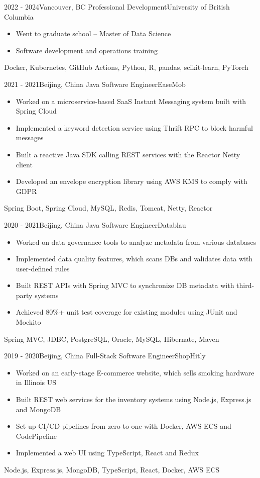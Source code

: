 \begin{experiences}

\experience
{2022 - 2024}{Vancouver, BC}
{Professional Development}{University of British Columbia}
{
    \begin{itemize}
    \item Went to graduate school -- Master of Data Science
    \item Software development and operations training
    \end{itemize}
}
{Docker, Kubernetes, GitHub Actions, Python, R, pandas, scikit-learn, PyTorch}

\emptySeparator

\experience
{2021 - 2021}{Beijing, China}
{Java Software Engineer}{EaseMob}
{
    \begin{itemize}
    \item Worked on a microservice-based SaaS Instant Messaging system built with Spring Cloud
    \item Implemented a keyword detection service using Thrift RPC to block harmful messages
    \item Built a reactive Java SDK calling REST services with the Reactor Netty client
    \item Developed an envelope encryption library using AWS KMS to comply with GDPR
    \end{itemize}
}
{Spring Boot, Spring Cloud, MySQL, Redis, Tomcat, Netty, Reactor}

\emptySeparator

\experience
{2020 - 2021}{Beijing, China}
{Java Software Engineer}{Datablau}
{
    \begin{itemize}
    \item Worked on data governance tools to analyze metadata from various databases
    \item Implemented data quality features, which scans DBs and validates data with user-defined rules
    \item Built REST APIs with Spring MVC to synchronize DB metadata with third-party systems
    \item Achieved 80\%+ unit test coverage for existing modules using JUnit and Mockito
    \end{itemize}
}
{Spring MVC, JDBC, PostgreSQL, Oracle, MySQL, Hibernate, Maven}

\emptySeparator

\experience
{2019 - 2020}{Beijing, China}
{Full-Stack Software Engineer}{ShopHitly}
{
    \begin{itemize}
    \item Worked on an early-stage E-commerce website, which sells smoking hardware in Illinois US
    \item Built REST web services for the inventory systems using Node.js, Express.js and MongoDB
    \item Set up CI/CD pipelines from zero to one with Docker, AWS ECS and CodePipeline
    \item Implemented a web UI using TypeScript, React and Redux
    \end{itemize}
}
{Node.js, Express.js, MongoDB, TypeScript, React, Docker, AWS ECS}


\end{experiences}

